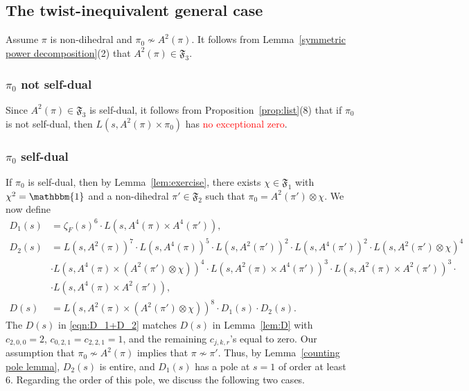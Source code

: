 \documentclass[11pt]{amsart}
\theoremstyle{remark}
\newcommand{\fF}{\mathfrak{F}}
\numberwithin{equation}{section}
\begin{document}
\subsection{The twist-inequivalent general case}
Assume $\pi$ is non-dihedral and $\pi_0 \not\sim A^2(\pi)$.  It follows from Lemma~\ref{symmetric power decomposition}(2) that $A^2(\pi)\in\mathfrak{F}_3$.

\subsubsection{$\pi_0$ not self-dual}

Since $A^2(\pi) \in \fF_3$ is self-dual, it follows from Proposition~\ref{prop:list}(8) that if $\pi_0$ is not self-dual, then $L(s,A^2(\pi) \times \pi_0)$ has \textcolor{red}{no exceptional zero}.

\subsubsection{$\pi_0$ self-dual}
\label{subsubsec:3x3_SD}

If $\pi_0$ is self-dual, then by Lemma~\ref{lem:exercise}, there exists $\chi \in \fF_1$ with $\chi^2=\mathbbm{1}$ and a non-dihedral $\pi' \in \fF_2$ such that $\pi_0 = A^2(\pi') \otimes \chi$.  We now define
\begin{equation}
\label{eqn:D_1+D_2}
\begin{aligned}
    D_1(s) &= \zeta_F(s)^6 \cdot L(s,A^4(\pi) \times A^4(\pi')), \\
    D_2(s) &= L(s,A^2(\pi))^7\cdot  L(s,A^4(\pi))^5\cdot L(s,A^2(\pi'))^2\cdot  L(s,A^4(\pi'))^2    \cdot  L(s,A^2(\pi') \otimes \chi)^4 \\
    &  \cdot L(s,A^4(\pi) \times (A^2(\pi') \otimes \chi))^4\cdot  L(s,A^2(\pi) \times A^4(\pi'))^3  \cdot  L(s,A^2(\pi) \times A^2(\pi'))^3  \cdot   \\
    & \cdot L(s,A^4(\pi) \times A^2(\pi')),\\
    D(s)&= L(s,A^2(\pi) \times (A^2(\pi') \otimes \chi))^8 \cdot D_1(s) \cdot D_2(s).
\end{aligned}
\end{equation}
The $D(s)$ in \eqref{eqn:D_1+D_2} matches $D(s)$ in Lemma~\ref{lem:D} with $c_{2,0,0} = 2$, $c_{0,2,1} = c_{2,2,1} = 1$, and the remaining $c_{j,k,r}$'s equal to zero.  Our assumption that $\pi_0 \not\sim A^2(\pi)$ implies that $\pi \not\sim \pi'$. Thus, by Lemma~\ref{counting pole lemma}, $D_2(s)$ is entire, and $D_1(s)$ has a pole at $s=1$ of order at least 6.  Regarding the order of this pole, we discuss the following two cases.
\end{document}
